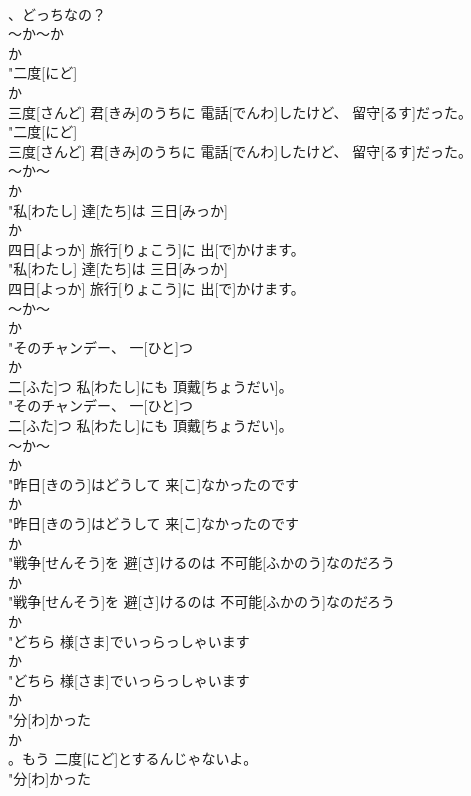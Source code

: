 \documentclass[8pt]{extreport}
\begin{document}
\begin{CJK}{UTF8}{min}
\\	、どっちなの？
\\	～か～か 
\\	か
\\	"二度[にど]
\\	か
\\	三度[さんど] 君[きみ]のうちに 電話[でんわ]したけど、 留守[るす]だった。
\\	"二度[にど]
\\	三度[さんど] 君[きみ]のうちに 電話[でんわ]したけど、 留守[るす]だった。
\\	～か～	
\\	か
\\	"私[わたし] 達[たち]は 三日[みっか]
\\	か
\\	四日[よっか] 旅行[りょこう]に 出[で]かけます。
\\	"私[わたし] 達[たち]は 三日[みっか]
\\	四日[よっか] 旅行[りょこう]に 出[で]かけます。
\\	～か～	
\\	か
\\	"そのチャンデー、 一[ひと]つ
\\	か
\\	二[ふた]つ 私[わたし]にも 頂戴[ちょうだい]。
\\	"そのチャンデー、 一[ひと]つ
\\	二[ふた]つ 私[わたし]にも 頂戴[ちょうだい]。
\\	～か～	
\\	か
\\	"昨日[きのう]はどうして 来[こ]なかったのです
\\	か
\\	"昨日[きのう]はどうして 来[こ]なかったのです
\\	か
\\	"戦争[せんそう]を 避[さ]けるのは 不可能[ふかのう]なのだろう
\\	か
\\	"戦争[せんそう]を 避[さ]けるのは 不可能[ふかのう]なのだろう
\\	か
\\	"どちら 様[さま]でいっらっしゃいます
\\	か
\\	"どちら 様[さま]でいっらっしゃいます
\\	か
\\	"分[わ]かった
\\	か
\\	。もう 二度[にど]とするんじゃないよ。
\\	"分[わ]かった

\end{CJK}
\end{document}
